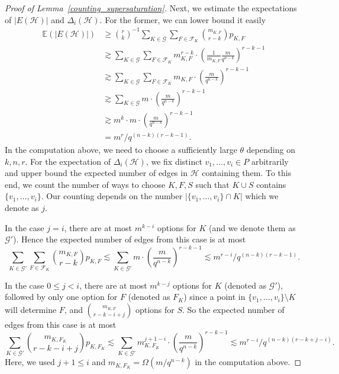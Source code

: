 \documentclass[11pt]{article}
\theoremstyle{definition}
\begin{document}
\begin{proof}[Proof of Lemma~\ref{counting_supersaturation}]
    Next, we estimate the expectations of $|E(\mathcal{H})|$ and $\Delta_i(\mathcal{H})$. For the former, we can lower bound it easily \begin{align*}
        \mathbb{E}(|E(\mathcal{H})|) &\geq  \binom{r}{k}^{-1} \sum_{K \in \mathcal{G}} \sum_{F\in \mathcal{F}_K}\binom{m_{K,F}}{r-k} p_{K,F}\\
        &\gtrsim \sum_{K \in \mathcal{G}} \sum_{F\in \mathcal{F}_K} m_{K,F}^{r-k} \cdot \left( \frac{1}{m_{K,F}} \frac{m}{q^{n-k}} \right)^{r - k - 1}\\
        &\gtrsim \sum_{K \in \mathcal{G}} \sum_{F\in \mathcal{F}_K}m_{K,F} \cdot \left(\frac{m}{q^{n-k}} \right)^{r - k - 1}\\
        &\gtrsim \sum_{K \in \mathcal{G}} m \cdot \left(\frac{m}{q^{n-k}} \right)^{r - k - 1}\\
        &\gtrsim m^k \cdot m \cdot \left(\frac{m}{q^{n-k}} \right)^{r - k - 1}\\
        &= m^r/q^{(n-k)(r-k-1)}.
    \end{align*} In the computation above, we need to choose a sufficiently large $\theta$ depending on $k,n,r$. For the expectation of $\Delta_i(\mathcal{H})$, we fix distinct $v_1,\dots,v_i \in P$ arbitrarily and upper bound the expected number of edges in $\mathcal{H}$ containing them. To this end, we count the number of ways to choose $K,F,S$ such that $K \cup S$ contains $\{v_1,\dots,v_i\}$. Our counting depends on the number $|\{v_1, \dots, v_i\} \cap K|$ which we denote as $j$.
    
    In the case $j = i$, there are at most $m^{k - i}$ options for $K$ (and we denote them as $\mathcal{G}'$). Hence the expected number of edges from this case is at most \begin{equation*}
        \sum_{K \in \mathcal{G}'} \sum_{F \in \mathcal{F}_K} \binom{m_{K,F}}{r-k} p_{K,F} \lesssim \sum_{K \in \mathcal{G}'} m \cdot \left(\frac{m}{q^{n-k}} \right)^{r-k - 1} \lesssim m^{r-i}/q^{(n-k)(r-k-1)}.
    \end{equation*}

    In the case $0 \leq j < i$, there are at most $m^{k-j}$ options for $K$ (denoted as $\mathcal{G}'$), followed by only one option for $F$ (denoted as $F_K$) since a point in $\{v_1, \dots, v_i\} \setminus K$ will determine $F$, and $\binom{m_{K,F}}{r-k-i+j}$ options for $S$. So the expected number of edges from this case is at most
    \begin{equation*}
        \sum_{K \in \mathcal{G}'} \binom{m_{K,F_K}}{r-k-i+j} p_{K,F_K} \lesssim \sum_{K \in \mathcal{G}'} m_{K,F_K}^{j+1-i} \cdot \left(\frac{m}{q^{n-k}} \right)^{r-k - 1} %
        \lesssim m^{r-i}/q^{(n-k)(r-k + j -i)}.
    \end{equation*} Here, we used $j + 1 \leq i$ and $m_{K,F_K} = \Omega(m/q^{n-k})$ in the computation above.


\end{proof}
\end{document}
